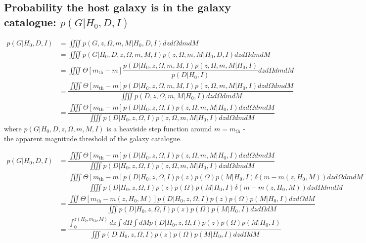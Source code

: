 \documentclass[a4paper,10pt]{article}
\begin{document}
\subsection{Probability the host galaxy is in the galaxy catalogue: $p(G|H_0,D,I)$}


\begin{equation}
\begin{aligned}
p(G|H_0,D,I) &= \iiiint p(G,z,\Omega,m,M|H_0,D,I) dz d\Omega dm dM
\\ &= \iiiint p(G|H_0,D,z,\Omega,m,M,I) p(z,\Omega,m,M|H_0,D,I) dz d\Omega dm dM
\\ &= \iiiint \Theta[m_{\text{th}}-m] \dfrac{p(D|H_0,z,\Omega,m,M,I) p(z,\Omega,m,M|H_0,I)}{p(D|H_0,I)}  dz d\Omega dm dM
\\ &=  \dfrac{\iiiint \Theta[m_{\text{th}}-m] p(D|H_0,z,\Omega,m,M,I) p(z,\Omega,m,M|H_0,I) dz d\Omega dm dM}{\iiiint p(D,z,\Omega,m,M|H_0,I) dz d\Omega dm dM} 
\\ &=  \dfrac{\iiiint \Theta[m_{\text{th}}-m] p(D|H_0,z,\Omega,I) p(z,\Omega,m,M|H_0,I) dz d\Omega dm dM}{\iiiint p(D|H_0,z,\Omega,I) p(z,\Omega,m,M|H_0,I) dz d\Omega dm dM} 
\end{aligned}
\end{equation}
where $p(G|H_0,D,z,\Omega,m,M,I)$ is a heaviside step function around $m = m_{\text{th}}$ - the apparent magnitude threshold of the galaxy catalogue.

\begin{equation}
\begin{aligned}
p(G|H_0,D,I) &=  \dfrac{\iiiint \Theta[m_{\text{th}}-m] p(D|H_0,z,\Omega,I) p(z,\Omega,m,M|H_0,I) dz d\Omega dm dM}{\iiiint p(D|H_0,z,\Omega,I) p(z,\Omega,m,M|H_0,I) dz d\Omega dm dM} 
\\ &= \dfrac{\iiiint \Theta[m_{\text{th}}-m] p(D|H_0,z,\Omega,I) p(z)p(\Omega)p(M|H_0,I)\delta(m - m(z,H_0,M)) dz d\Omega dm dM}{\iiiint p(D|H_0,z,\Omega,I) p(z)p(\Omega)p(M|H_0,I)\delta(m - m(z,H_0,M)) dz d\Omega dm dM}
\\ &= \dfrac{\iiint \Theta[m_{\text{th}}-m(z,H_0,M)] p(D|H_0,z,\Omega,I) p(z)p(\Omega)p(M|H_0,I)dz d\Omega dM}{\iiint p(D|H_0,z,\Omega,I) p(z)p(\Omega)p(M|H_0,I) dz d\Omega dM}
\\ &= \dfrac{\int^{z(H_0,m_{\text{th}},M)}_0 dz \int d\Omega \int dM p(D|H_0,z,\Omega,I) p(z)p(\Omega)p(M|H_0,I)}{\iiint p(D|H_0,z,\Omega,I) p(z)p(\Omega)p(M|H_0,I) dz d\Omega dM}
\end{aligned}
\end{equation}
\end{document}
